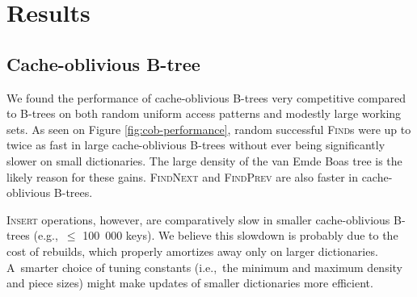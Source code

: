 \chapter{Results}
\label{chapter:results}

\section{Cache-oblivious B-tree}
We found the performance of cache-oblivious B-trees very competitive compared
to B-trees on both random uniform access patterns and modestly large working
sets. As seen on Figure \ref{fig:cob-performance}, random successful
\textsc{Find}s were up to twice as fast in large cache-oblivious B-trees
without ever being significantly slower on small dictionaries.
The large density of the van Emde Boas tree is the likely reason for these
gains.
\textsc{FindNext} and \textsc{FindPrev} are also faster in cache-oblivious
B-trees.

\textsc{Insert} operations, however, are comparatively slow in
smaller cache-oblivious B-trees (e.g.,\ $\leq$ 100~000 keys). We believe
this slowdown is probably due to the cost of rebuilds, which properly
amortizes away only on larger dictionaries. A~smarter choice of tuning
constants (i.e.,\ the minimum and maximum density and piece sizes) might
make updates of smaller dictionaries more efficient.

